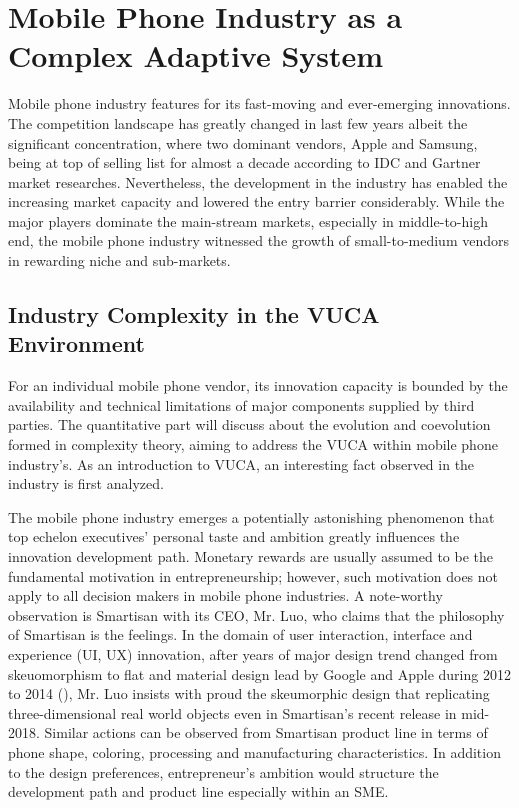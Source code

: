 \documentclass[utf8,english]{gradu3}
\begin{document}
\chapter{Mobile Phone Industry as a Complex Adaptive System}

Mobile phone industry features for its fast-moving and ever-emerging innovations. The competition landscape has greatly changed in last few years albeit the significant concentration, where two dominant vendors, Apple and Samsung, being at top of selling list for almost a decade according to IDC and Gartner market researches. Nevertheless, the development in the industry has enabled the increasing market capacity and lowered the entry barrier considerably. While the major players dominate the main-stream markets, especially in middle-to-high end, the mobile phone industry witnessed the growth of small-to-medium vendors in rewarding niche and sub-markets.

\section{Industry Complexity in the VUCA Environment}

For an individual mobile phone vendor, its innovation capacity is bounded by the availability and technical limitations of major components supplied by third parties. The quantitative part will discuss about the evolution and coevolution formed in complexity theory, aiming to address the VUCA within mobile phone industry's. As an introduction to VUCA, an interesting fact observed in the industry is first analyzed.

The mobile phone industry emerges a potentially astonishing phenomenon that top echelon executives' personal taste and ambition greatly influences the innovation development path. Monetary rewards are usually assumed to be the fundamental motivation in entrepreneurship; however, such motivation does not apply to all decision makers in mobile phone industries. A note-worthy observation is Smartisan with its CEO, Mr. Luo, who claims that the philosophy of Smartisan is the feelings. In the domain of user interaction, interface and experience (UI, UX) innovation, after years of major design trend changed from skeuomorphism to flat and material design lead by Google and Apple during 2012 to 2014 (\cite{burmistrov2015flat}), Mr. Luo insists with proud the skeumorphic design that replicating three-dimensional real world objects even in Smartisan's recent release in mid-2018. Similar actions can be observed from Smartisan product line in terms of phone shape, coloring, processing and manufacturing characteristics. In addition to the design preferences, entrepreneur's ambition would structure the development path and product line especially within an SME. 
\end{document}
